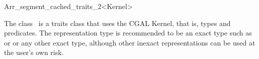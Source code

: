 
\ccRefPageBegin


\begin{ccRefClass}{Arr_segment_cached_traits_2<Kernel>}

\ccDefinition
   The class \ccRefName\ is
   a traits class that uses the CGAL Kernel, that is, types and predicates.
   The representation type  is recommended to be an
   exact type such as  or
    or any other
   exact type, although other inexact representations can be used at
   the user's own risk.


\ccIsModel
     


\end{ccRefClass} %

\ccRefPageEnd
